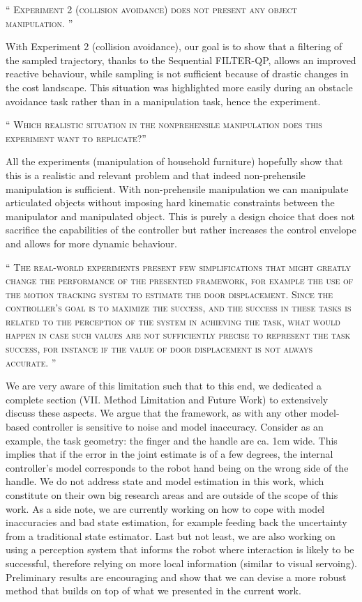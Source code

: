 \documentclass[10pt]{article}
\newcommand{\referee}[1]{\;
  \begin{minipage}[t]{.95\textwidth}
    ``{\small\color{red} \textsc{#1}}''
  \end{minipage}\medskip
  }
\begin{document}
\begin{enumerate}[label={[R7:\,\arabic{enumi}]}]
\item\label{reply:R7:3} 
\referee{Experiment 2 (collision avoidance) does not present any object manipulation. }

With Experiment 2 (collision avoidance), our goal is to show that a filtering of the sampled trajectory, thanks to the Sequential FILTER-QP, allows an improved reactive behaviour, while sampling is not sufficient because of drastic changes in the cost landscape. This situation was highlighted more easily during an obstacle avoidance task rather than in a manipulation task, hence the experiment.

\item\label{reply:R7:4} 
\referee{Which realistic situation in the nonprehensile manipulation does this experiment want to replicate?}

All the experiments (manipulation of household furniture) hopefully show that this is a realistic and relevant problem and that indeed non-prehensile manipulation is sufficient. With non-prehensile manipulation we can manipulate articulated objects without imposing hard kinematic constraints between the manipulator and manipulated object. This is purely a design choice that does not sacrifice the capabilities of the controller but rather increases the control envelope and allows for more dynamic behaviour.


\item\label{reply:R7:5} 
\referee{The real-world experiments present few simplifications that might greatly change the performance of the presented framework, for example the use of the motion tracking system to estimate the door displacement. Since the controller's goal is to maximize the success,
and the success in these tasks is related to the perception of the system in achieving the task, what would happen in case such values are not sufficiently precise to represent the task success, for instance if the value of door displacement is not always accurate. 
}

We are very aware of this limitation such that to this end, we dedicated a complete section (VII. Method Limitation and Future Work) to extensively discuss these aspects. We argue that the framework, as with any other model-based controller is sensitive to noise and model inaccuracy. Consider as an example, the task geometry: the finger and the handle are ca. 1cm wide. This implies that if the error in the joint estimate is of a few degrees, the internal controller's model corresponds to the robot hand being on the wrong side of the handle. We do not address state and model estimation in this work, which constitute on their own big research areas and are outside of the scope of this work. As a side note, we are currently working on how to cope with model inaccuracies and bad state estimation, for example feeding back the uncertainty from a traditional state estimator. Last but not least, we are also working on using a perception system that informs the robot where interaction is likely to be successful, therefore relying on more local information (similar to visual servoing). Preliminary results are encouraging and show that we can devise a more robust method that builds on top of what we presented in the current work.



\end{enumerate}
\end{document}

